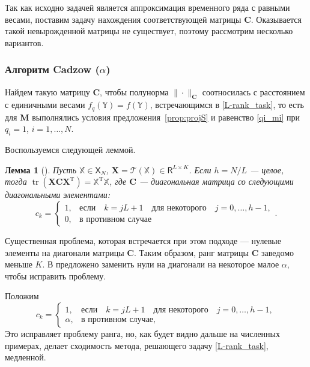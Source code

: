 \documentclass[12pt,a4paper,fleqn,leqno]{article}
\DeclareMathOperator{\tr}{tr}
\newtheorem{lemma}{Лемма}
\newcommand{\rmT}{\mathrm{T}}
\newcommand{\tsX}{\mathbb{X}}
\newcommand{\tsY}{\mathbb{Y}}
\newcommand{\bfC}{\mathbf{C}}
\newcommand{\bfM}{\mathbf{M}}
\newcommand{\bfX}{\mathbf{X}}
\newcommand{\calT}{\mathcal{T}}
\newcommand{\sfR}{\mathsf{R}}
\newcommand{\sfX}{\mathsf{X}}
\begin{document}
Так как исходно задачей является аппроксимация временного ряда с равными весами, поставим задачу нахождения соответствующей матрицы $\bfC$.
Оказывается такой невырожденной матрицы не существует, поэтому рассмотрим несколько вариантов.

\subsubsection{Алгоритм Cadzow ($\alpha$)}
\label{sec:cadzow_alpha}
Найдем такую матрицу $\bfC$, чтобы полунорма $\|\cdot\|_{\bfC}$ соотносилась с расстоянием с единичными весами $f_q(\tsY) = f(\tsY)$, встречающимся в \eqref{L-rank_task}, то есть для $\bfM$ выполнялись условия предложения~\ref{prop:projS} и равенство \eqref{qi_mi} при $q_i = 1$, $i=1,\ldots,N$.

Воспользуемся следующей леммой.

\begin{lemma}[\cite{Gillard2014}]
\label{zhiglemma}
Пусть $\tsX \in \sfX_N$, $\bfX = \calT(\tsX) \in \sfR^{L \times K}$. Если $h = N/L$ --- целое, тогда $\tr(\bfX \bfC \bfX^\rmT) = \tsX^\rmT \tsX$, где $\bfC$ --- диагональная матрица со следующими диагональными элементами:
\begin{equation*}
c_k = \begin{cases}
1, & \text{если} \quad k = jL+1 \quad \text{для некоторого} \quad j = 0, \ldots, h-1, \\
0, & \text{в противном случае}
\end{cases}.
\end{equation*}
\end{lemma}

Существенная проблема, которая встречается при этом подходе --- нулевые элементы на диагонали матрицы $\bfC$. Таким образом, ранг матрицы $\bfC$ заведомо меньше $K$. В \cite{Gillard2014} предложено заменить нули на диагонали на некоторое малое $\alpha$, чтобы исправить проблему.

Положим
\begin{equation}\label{zhigweights}
c_k = \begin{cases}
1, & \text{если} \quad k = jL+1 \quad \text{для некоторого} \quad j = 0, \ldots, h-1, \\
\alpha, & \text{в противном случае,}
\end{cases}
\end{equation}
Это исправляет проблему ранга, но, как будет видно дальше на численных примерах, делает сходимость метода, решающего задачу \eqref{L-rank_task}, медленной.
\end{document}
